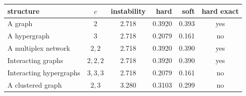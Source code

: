 \begin{tabular}{lccrrc}
\hline\hline
structure & $c$ & instability & hard & soft & hard exact\\
\hline
A graph & $2$ & 2.718 & 0.3920 & 0.393 & yes\\
A hypergraph & $3$ & 2.718 & 0.2079 & 0.161 & no\\
A multiplex network & $2,2$ & 2.718 & 0.3920 & 0.390 & yes\\
Interacting graphs & $2,2,2$ & 2.718 & 0.3920 & 0.390 & yes\\
Interacting hypergraphs & $3,3,3$ & 2.718 & 0.2079 & 0.161 & no\\
A clustered graph & $2,3$ & 3.280 & 0.3103 & 0.299 & no\\
\hline\hline
\end{tabular}
